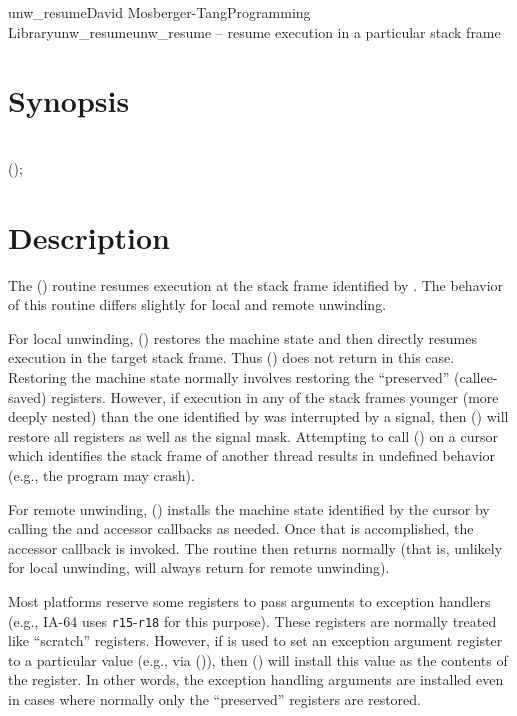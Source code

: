 \documentclass{article}
\begin{document}
\begin{Name}{3}{unw\_resume}{David Mosberger-Tang}{Programming Library}{unw\_resume}unw\_resume -- resume execution in a particular stack frame
\end{Name}

\section{Synopsis}

\\

 ();\\

\section{Description}

The () routine resumes execution at the stack frame
identified by .  The behavior of this routine differs
slightly for local and remote unwinding.

For local unwinding, () restores the machine state
and then directly resumes execution in the target stack frame.  Thus
() does not return in this case.  Restoring the
machine state normally involves restoring the ``preserved''
(callee-saved) registers.  However, if execution in any of the stack
frames younger (more deeply nested) than the one identified by
 was interrupted by a signal, then () will
restore all registers as well as the signal mask.  Attempting to call
() on a cursor which identifies the stack frame of
another thread results in undefined behavior (e.g., the program may
crash).

For remote unwinding, () installs the machine state
identified by the cursor by calling the  and
 accessor callbacks as needed.  Once that is
accomplished, the  accessor callback is invoked.  The
 routine then returns normally (that is, unlikely
for local unwinding,  will always return for remote
unwinding).

Most platforms reserve some registers to pass arguments to exception
handlers (e.g., IA-64 uses \texttt{r15}-\texttt{r18} for this
purpose).  These registers are normally treated like ``scratch''
registers.  However, if  is used to set an exception
argument register to a particular value (e.g., via
()), then () will install this
value as the contents of the register.  In other words, the exception
handling arguments are installed even in cases where normally only the
``preserved'' registers are restored.
\end{document}
